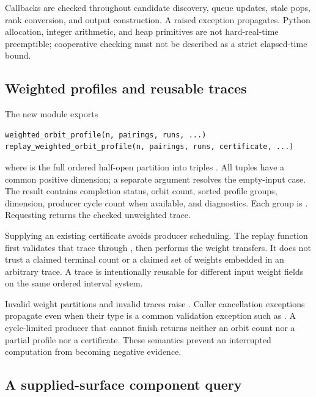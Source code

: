 Callbacks are checked throughout candidate discovery, queue updates, stale
pops, rank conversion, and output construction.  A raised exception
propagates.  Python allocation, integer arithmetic, and heap primitives are
not hard-real-time preemptible; cooperative checking must not be described
as a strict elapsed-time bound.

\subsection{Weighted profiles and reusable traces}

The new module  exports
\begin{verbatim}
weighted_orbit_profile(n, pairings, runs, ...)
replay_weighted_orbit_profile(n, pairings, runs, certificate, ...)
\end{verbatim}
where  is the full ordered half-open partition into triples
.  All tuples have a common positive
dimension; a separate  argument resolves the empty-input
case.  The result contains completion status, orbit count, sorted profile
groups, dimension, producer cycle count when available, and diagnostics.
Each group is .  Requesting
 returns the checked unweighted trace.

Supplying an existing certificate avoids producer scheduling.  The replay
function first validates that trace through
, then performs the weight
transfers.  It does not trust a claimed terminal count or a claimed set of
weights embedded in an arbitrary trace.  A trace is intentionally reusable
for different input weight fields on the same ordered interval system.

Invalid weight partitions and invalid traces raise
.  Caller cancellation exceptions propagate even
when their type is a common validation exception such as .
A cycle-limited producer that cannot finish returns neither an orbit count
nor a partial profile nor a certificate.  These semantics prevent an
interrupted computation from becoming negative evidence.

\subsection{A supplied-surface component query}

